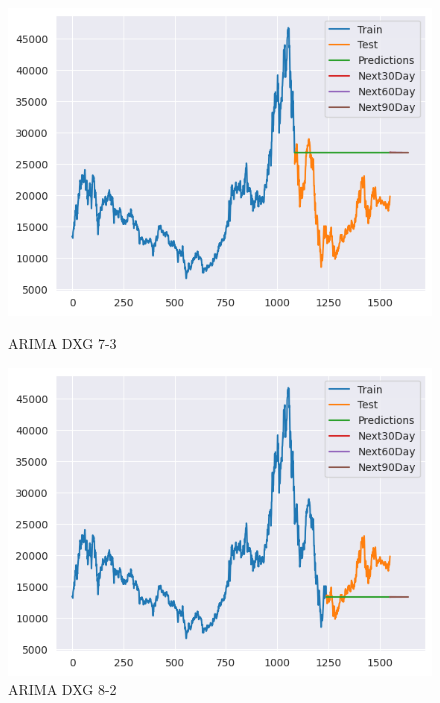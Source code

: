 \documentclass[conference]{IEEEtran}
\begin{document}
\begin{figure}[htbp]
    \begin{minipage}{0.23\textwidth}
    \centering
    \includegraphics[width=1\textwidth]{experiment/arima/DXG/7 _ 3/7_3_train_test_DXG_ARIMA_plot.png}
    \caption{ARIMA DXG 7-3}
    \label{fig:nvl_boxplot}
    \end{minipage}
    \hfill
    \begin{minipage}{0.23\textwidth}
    \centering
    \includegraphics[width=1\textwidth]{experiment/arima/DXG/8 _ 2/8_2_train_test_DXG_ARIMA_plot.png}
    \caption{ARIMA DXG 8-2}
    \label{fig:nvl_histogram}
    \end{minipage}
    \begin{minipage}{0.23\textwidth}
    \centering

\end{minipage}
\end{figure}
\end{document}
